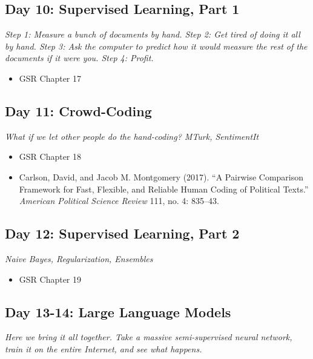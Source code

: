 \documentclass[11pt, letterpaper]{article}
\begin{document}
\subsection*{Day 10: Supervised Learning, Part 1}

\textit{Step 1: Measure a bunch of documents by hand. Step 2: Get tired of doing it all by hand. Step 3: Ask the computer to predict how it would measure the rest of the documents if it were you. Step 4: Profit.}

\begin{itemize}
	\item GSR Chapter 17
\end{itemize}



\subsection*{Day 11: Crowd-Coding}

\textit{What if we let other people do the hand-coding? MTurk, SentimentIt}

\begin{itemize}
	\item GSR Chapter 18
	\item Carlson, David, and Jacob M. Montgomery (2017). ``A Pairwise Comparison Framework for Fast, Flexible, and Reliable Human Coding of Political Texts.'' \textit{American Political Science Review} 111, no. 4: 835–43.
	
\end{itemize}

\subsection*{Day 12: Supervised Learning, Part 2}

\textit{Naive Bayes, Regularization, Ensembles}

\begin{itemize}
	\item GSR Chapter 19
\end{itemize}

\subsection*{Day 13-14: Large Language Models}

\textit{Here we bring it all together. Take a massive semi-supervised neural network, train it on the entire Internet, and see what happens.}
\end{document}
